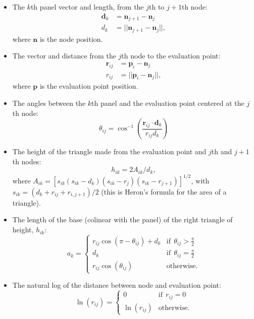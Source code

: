 \documentclass[]{article}
\newcommand{\vect}{\mathbf}
\begin{document}
\begin{itemize}
	\item The \(k\)th panel vector and length, from the \(j\)th to \(j+1\)th node:
	\begin{align}
		\vect{d}_k &= \vect{n}_{j+1} - \vect{n}_j \\
		d_k &= || \vect{n}_{j+1} - \vect{n}_j ||,
	\end{align}
	\noindent where \(\vect{n}\) is the node position.
	\item The vector and distance from the \(j\)th node to the evaluation point:
	\begin{align}
		\vect{r}_{ij} &= \vect{p}_i - \vect{n}_j \\
		r_{ij} &= ||\vect{p}_i - \vect{n}_j||,
	\end{align}
	\noindent where \(\vect{p}\) is the evaluation point position.
	\item The angles between the \(k\)th panel and the evaluation point centered at the \(j\)th node:
	\begin{equation}
		\theta_{ij} = \cos^{-1}\left( \frac{\vect{r}_{ij} \cdot \vect{d}_k}{r_{ij}d_k} \right)
	\end{equation}
	\item The height of the triangle made from the evaluation point and \(j\)th and \(j+1\)th nodes:
	\begin{equation}
		h_{ik} = 2A_{ik}/d_k,
	\end{equation}
	\noindent where \(A_{ik} = \left[ s_{ik} (s_{ik} - d_k) (s_{ik} - r_j) (s_{ik} - r_{j+1}) \right]^{1/2} \), with \(s_{ik} = (d_k + r_{ij} + r_{i,j+1})/2\) (this is Heron's formula for the area of a triangle).
	\item The length of the base (colinear with the panel) of the right triangle of height, \(h_{ik}\):
	\begin{equation}
		a_k = \begin{cases}
			r_{ij} \cos(\pi - \theta_{ij}) + d_k & \mathrm{if}~~ \theta_{ij} > \frac{\pi}{2} \\
			d_k & \mathrm{if}~~ \theta_{ij} = \frac{\pi}{2} \\
			r_{ij}\cos(\theta_{ij}) & \mathrm{otherwise.} 
		\end{cases}
	\end{equation}
	\item The natural log of the distance between node and evaluation point:
	\begin{equation}
		\ln(r_{ij}) = \begin{cases}
			0 & \mathrm{if}~~ r_{ij} = 0 \\
			\ln(r_{ij}) & \mathrm{otherwise.}
		\end{cases}
	\end{equation}
\end{itemize}
\end{document}
